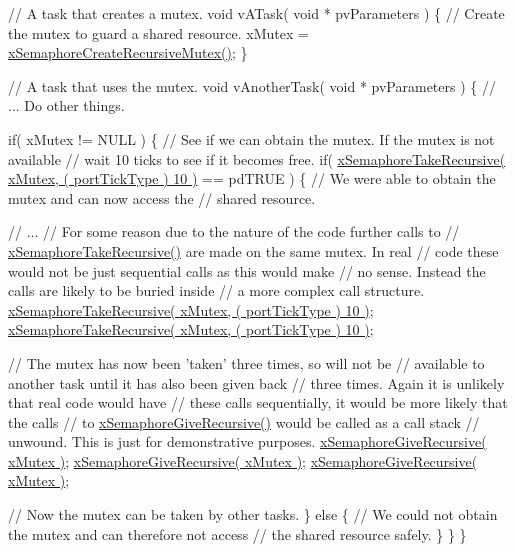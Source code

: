 \begin{DoxyPre}// A task that creates a mutex.
void vATask( void * pvParameters )
\{
   // Create the mutex to guard a shared resource.
   xMutex = \hyperlink{semphr_8h_a1bbc843be5a41ea83d2693b2189fc0f8}{xSemaphoreCreateRecursiveMutex()};
\}\end{DoxyPre}



\begin{DoxyPre}// A task that uses the mutex.
void vAnotherTask( void * pvParameters )
\{
   // ... Do other things.\end{DoxyPre}



\begin{DoxyPre}   if( xMutex != NULL )
   \{
       // See if we can obtain the mutex.  If the mutex is not available
       // wait 10 ticks to see if it becomes free.  
       if( \hyperlink{semphr_8h_ad395f4bba51eea6af3397d72bc079e4d}{xSemaphoreTakeRecursive( xMutex, ( portTickType ) 10 )} == pdTRUE )
       \{
           // We were able to obtain the mutex and can now access the
           // shared resource.\end{DoxyPre}



\begin{DoxyPre}           // ...
           // For some reason due to the nature of the code further calls to 
        // \hyperlink{semphr_8h_ad395f4bba51eea6af3397d72bc079e4d}{xSemaphoreTakeRecursive()} are made on the same mutex.  In real
        // code these would not be just sequential calls as this would make
        // no sense.  Instead the calls are likely to be buried inside
        // a more complex call structure.
           \hyperlink{semphr_8h_ad395f4bba51eea6af3397d72bc079e4d}{xSemaphoreTakeRecursive( xMutex, ( portTickType ) 10 )};
           \hyperlink{semphr_8h_ad395f4bba51eea6af3397d72bc079e4d}{xSemaphoreTakeRecursive( xMutex, ( portTickType ) 10 )};\end{DoxyPre}



\begin{DoxyPre}           // The mutex has now been 'taken' three times, so will not be 
        // available to another task until it has also been given back
        // three times.  Again it is unlikely that real code would have
        // these calls sequentially, it would be more likely that the calls
        // to \hyperlink{semphr_8h_a398d66b17856c22dd49d39aaac42f105}{xSemaphoreGiveRecursive()} would be called as a call stack
        // unwound.  This is just for demonstrative purposes.
           \hyperlink{semphr_8h_a398d66b17856c22dd49d39aaac42f105}{xSemaphoreGiveRecursive( xMutex )};
        \hyperlink{semphr_8h_a398d66b17856c22dd49d39aaac42f105}{xSemaphoreGiveRecursive( xMutex )};
        \hyperlink{semphr_8h_a398d66b17856c22dd49d39aaac42f105}{xSemaphoreGiveRecursive( xMutex )};\end{DoxyPre}



\begin{DoxyPre}        // Now the mutex can be taken by other tasks.
       \}
       else
       \{
           // We could not obtain the mutex and can therefore not access
           // the shared resource safely.
       \}
   \}
\}
\end{DoxyPre}
 